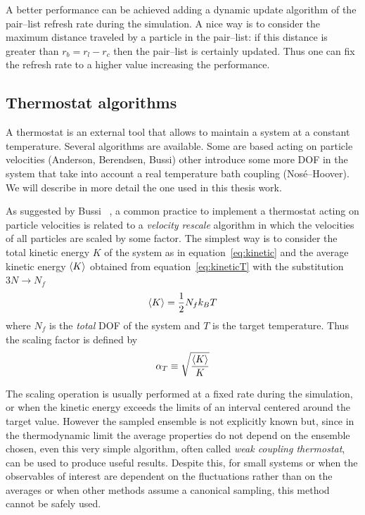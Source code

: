 A better performance can be achieved adding a dynamic update algorithm of the pair--list refresh rate during the 
simulation. A nice way is to consider the maximum distance traveled by a particle in the pair--list: if this 
distance is greater than $r_b = r_l - r_c$ then the pair--list is certainly updated. Thus one can fix the refresh 
rate to a higher value increasing the performance.

\subsection{Thermostat algorithms} %
A thermostat is an external tool that allows to maintain a system at a constant temperature. Several algorithms 
are available. Some are based acting on particle velocities (Anderson, Berendsen, Bussi) other introduce some 
more \ac{DOF} in the system that take into account a real temperature bath coupling (Nosé--Hoover). We will 
describe in more detail the one used in this thesis work.

As suggested by Bussi \etal\, \cite{Bussi}, a common practice to implement a thermostat acting on particle 
velocities is related to a \textit{velocity rescale} algorithm in which the velocities of all particles are 
scaled by some factor. The simplest way is to consider the total kinetic energy $K$ of the system as in 
equation~\eqref{eq:kinetic} and the average kinetic energy $\left \langle K \right \rangle$ obtained from equation~\eqref{eq:kineticT} 
with the substitution $3N\rightarrow N_f$
\begin{equation*}
	\left \langle K \right \rangle = \frac{1}{2}N_f k_B T
\end{equation*}
where $N_f$ is the \textit{total} \ac{DOF} of the system and $T$ is the target temperature. Thus the scaling 
factor is defined by
\begin{equation*}
	\alpha_{T} \equiv \sqrt{\frac{\left \langle K \right \rangle}{K}}
\end{equation*}

The scaling operation is usually performed at a fixed rate during the simulation, or when the kinetic energy 
exceeds the limits of an interval centered around the target value. However the sampled ensemble is not 
explicitly known but, since in the thermodynamic limit the average properties do not depend on the ensemble 
chosen, even this very simple algorithm, often called \textit{weak coupling thermostat}, can be used to produce 
useful results. Despite this, for small systems or when the observables of interest are dependent on the 
fluctuations rather than on the averages or when other methods assume a canonical sampling, this method cannot be 
safely used.

